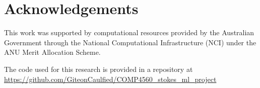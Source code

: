 \chapter*{Acknowledgements}

This work was supported by computational resources provided by the Australian Government through the National Computational Infrastructure (NCI) under the ANU Merit Allocation Scheme.

The code used for this research is provided in a repository at \url{https://github.com/GiteonCaulfied/COMP4560_stokes_ml_project}
